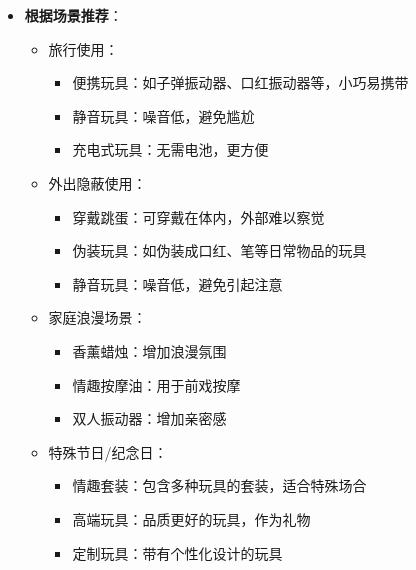 \documentclass[12pt,UTF8]{ctexbook}
\begin{document}
\begin{itemize}
\begin{itemize}
\begin{itemize}
		\end{itemize}
		\item 老年人：
		\begin{itemize}
			\item 温和振动器：刺激强度温和，适合老年人
			\item 润滑剂：缓解年龄增长引起的干燥
			\item 舒适型玩具：柔软材质，易于使用
		\end{itemize}
		\item 性创伤幸存者：
		\begin{itemize}
			\item 非常温和的玩具：如小型外部振动器
			\item 自我探索工具：帮助重新建立对身体的信心
			\item 心理咨询辅助：与专业心理咨询结合使用
		\end{itemize}
	\end{itemize}
	\item \textbf{根据场景推荐}：
	\begin{itemize}
		\item 旅行使用：
		\begin{itemize}
			\item 便携玩具：如子弹振动器、口红振动器等，小巧易携带
			\item 静音玩具：噪音低，避免尴尬
			\item 充电式玩具：无需电池，更方便
		\end{itemize}
		\item 外出隐蔽使用：
		\begin{itemize}
			\item 穿戴跳蛋：可穿戴在体内，外部难以察觉
			\item 伪装玩具：如伪装成口红、笔等日常物品的玩具
			\item 静音玩具：噪音低，避免引起注意
		\end{itemize}
		\item 家庭浪漫场景：
		\begin{itemize}
			\item 香薰蜡烛：增加浪漫氛围
			\item 情趣按摩油：用于前戏按摩
			\item 双人振动器：增加亲密感
		\end{itemize}
		\item 特殊节日/纪念日：
		\begin{itemize}
			\item 情趣套装：包含多种玩具的套装，适合特殊场合
			\item 高端玩具：品质更好的玩具，作为礼物
			\item 定制玩具：带有个性化设计的玩具
		\end{itemize}
	\end{itemize}
\end{itemize}
\end{document}
